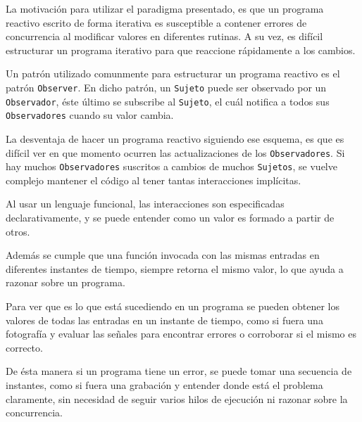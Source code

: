 
  La motivación para utilizar el paradigma presentado,
es que un programa reactivo escrito de forma iterativa
es susceptible a contener errores de concurrencia al modificar
valores en diferentes rutinas.
  A su vez, es difícil estructurar un programa iterativo para
que reaccione rápidamente a los cambios.

  Un patrón utilizado comunmente para estructurar un programa reactivo es el patrón \texttt{Observer}.
En dicho patrón, un \texttt{Sujeto} puede ser observado por un \texttt{Observador}, éste último se
subscribe al \texttt{Sujeto}, el cuál notifica a todos sus \texttt{Observadores} cuando su valor cambia.
  
  La desventaja de hacer un programa reactivo siguiendo ese esquema, es que es difícil ver en que
momento ocurren las actualizaciones de los \texttt{Observadores}.
  Si hay muchos \texttt{Observadores} suscritos a cambios de muchos \texttt{Sujetos},
se vuelve complejo mantener el código al tener tantas interacciones implícitas.

  Al usar un lenguaje funcional, las interacciones son especificadas declarativamente, y se puede
entender como un valor es formado a partir de otros.

  Además se cumple que una función invocada con las mismas entradas en diferentes
instantes de tiempo, siempre retorna el mismo valor, lo que ayuda a razonar sobre un programa.

  Para ver que es lo que está sucediendo en un programa se pueden obtener los valores de
  todas las entradas en un instante de tiempo, como si fuera una fotografía 
  y evaluar las señales para encontrar errores o corroborar si el mismo es correcto.

  De ésta manera si un programa tiene un error, se puede tomar una secuencia de instantes,
como si fuera una grabación y entender donde está el problema claramente,
sin necesidad de seguir varios hilos de ejecución ni razonar sobre la concurrencia.
